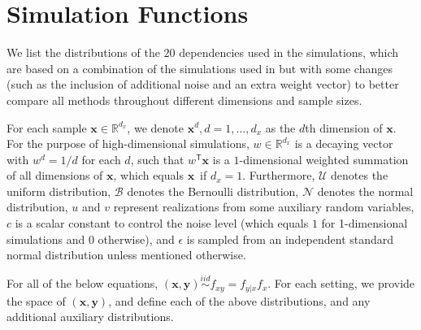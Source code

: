 \documentclass[11pt]{article}
\providecommand{\mb}[1]{\boldsymbol{#1}}
\providecommand{\mc}[1]{\mathcal{#1}}
\newcommand{\Real}{\mathbb{R}}
\newcommand{\T}{^{\ensuremath{\mathsf{T}}}}           %
\newcommand{\mbx}{\ensuremath{\mb{x}}}
\newcommand{\mby}{\ensuremath{\mb{y}}}
\begin{document}
\section{Simulation Functions}
\label{appen:function}

We list the distributions of the $20$ dependencies used in the simulations, which are based on a combination of the simulations used in \cite{SzekelyRizzoBakirov2007, SimonTibshirani2012, SimonTibshirani2012, GorfineHellerHeller2012} but with some changes (such as the inclusion of additional noise and an extra weight vector) to better compare all methods throughout different dimensions and sample sizes.

For each sample $\mbx \in \Real^{d_{x}}$, we denote $\mbx^{d}, d=1,\ldots,d_{x}$ as the $d$th dimension of \mbx. For the purpose of high-dimensional simulations, $w \in \Real^{d_{x}}$ is a decaying vector with $w^{d}=1/d$ for each $d$, such that $w\T \mbx$ is a $1$-dimensional weighted summation of all dimensions of \mbx, which equals \mbx~if $d_{x}=1$.
Furthermore, $\mc{U}$ denotes the uniform distribution, $\mc{B}$ denotes the Bernoulli distribution, $\mc{N}$ denotes the normal distribution, $u$ and $v$ represent realizations from some auxiliary random variables, $c$ is a scalar constant to control the noise level (which equals $1$ for 1-dimensional simulations and $0$ otherwise), and $\epsilon$ is sampled from an independent standard normal distribution unless mentioned otherwise.

For all of the below equations, $(\mbx,\mby) \overset{iid}{\sim} f_{xy} = f_{y|x} f_x$. For each setting, we provide the space of $(\mbx,\mby)$, and define each of the above distributions, and any additional auxiliary distributions.
\end{document}
